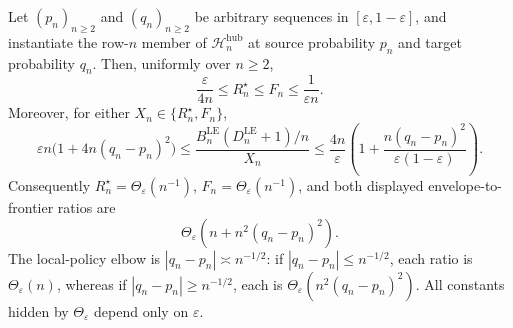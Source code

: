 Let \((p_n)_{n\ge2}\) and \((q_n)_{n\ge2}\) be arbitrary sequences in \([\varepsilon,1-\varepsilon]\), and instantiate the row-\(n\) member of \(\mathcal H_n^{\mathrm{hub}}\) at source probability \(p_n\) and target probability \(q_n\).  Then, uniformly over \(n\ge2\),
\[
 \frac{\varepsilon}{4n}
 \le R_n^{\star}\le F_n\le\frac1{\varepsilon n}.
\]
Moreover, for either \(X_n\in\{R_n^{\star},F_n\}\),
\[
 \varepsilon n\bigl(1+4n(q_n-p_n)^2\bigr)
 \le
 \frac{B_n^{\mathrm{LE}}(D_n^{\mathrm{LE}}+1)/n}{X_n}
 \le
 \frac{4n}{\varepsilon}
 \left(1+\frac{n(q_n-p_n)^2}{\varepsilon(1-\varepsilon)}\right).
\]
Consequently \(R_n^{\star}=\Theta_{\varepsilon}(n^{-1})\), \(F_n=\Theta_{\varepsilon}(n^{-1})\), and both displayed envelope-to-frontier ratios are
\[
 \Theta_{\varepsilon}\!\left(n+n^2(q_n-p_n)^2\right).
\]
The local-policy elbow is \(|q_n-p_n|\asymp n^{-1/2}\): if \(|q_n-p_n|\le n^{-1/2}\), each ratio is \(\Theta_{\varepsilon}(n)\), whereas if \(|q_n-p_n|\ge n^{-1/2}\), each is \(\Theta_{\varepsilon}(n^2(q_n-p_n)^2)\).  All constants hidden by \(\Theta_{\varepsilon}\) depend only on \(\varepsilon\).